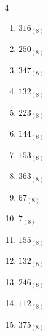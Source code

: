 \begin{multicols}{4}
\begin{enumerate}
        \phantom{$=55$}

  \item $316_{(8)}$

        \phantom{$=206$}

  \item $250_{(8)}$

        \phantom{$=168$}

  \item $347_{(8)}$

        \phantom{$=231$}

  \item $132_{(8)}$

        \phantom{$=90$}

  \item $223_{(8)}$

        \phantom{$=147$}

  \item $144_{(8)}$

        \phantom{$=100$}

  \item $153_{(8)}$

        \phantom{$=107$}

  \item $363_{(8)}$

        \phantom{$=243$}

  \item $67_{(8)}$

        \phantom{$=55$}

  \item $7_{(8)}$

        \phantom{$=7$}

  \item $155_{(8)}$

        \phantom{$=109$}

\columnbreak %

  \item $132_{(8)}$

        \phantom{$=90$}

  \item $246_{(8)}$

        \phantom{$=166$}

  \item $112_{(8)}$

        \phantom{$=74$}

  \item $375_{(8)}$

        \phantom{$=253$}


\end{enumerate}
\end{multicols}
